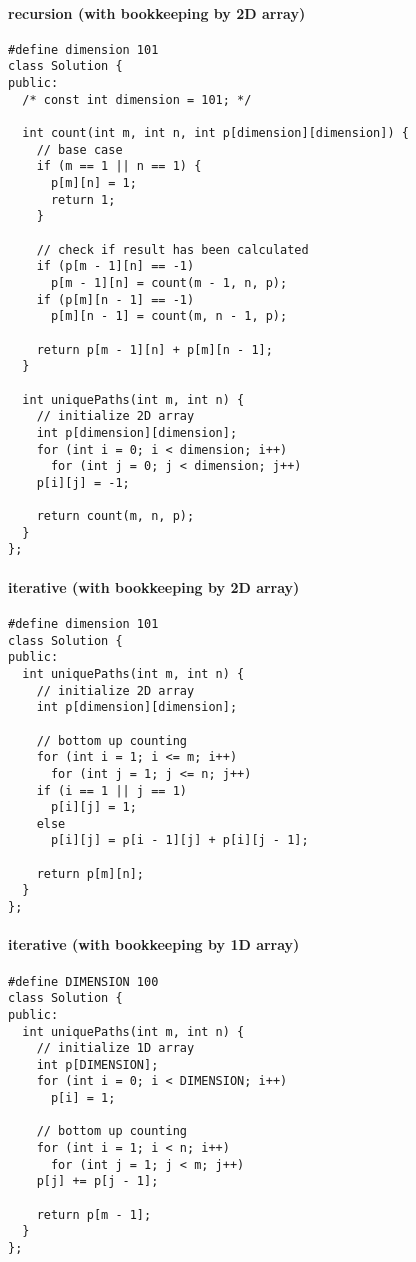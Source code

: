 \documentclass[11pt]{article}
\begin{document}
\paragraph{recursion (with bookkeeping by 2D array)}
\label{sec:org6ae9381}
\begin{verbatim}
#define dimension 101
class Solution {
public:
  /* const int dimension = 101; */

  int count(int m, int n, int p[dimension][dimension]) {
    // base case
    if (m == 1 || n == 1) {
      p[m][n] = 1;
      return 1;
    }

    // check if result has been calculated
    if (p[m - 1][n] == -1)
      p[m - 1][n] = count(m - 1, n, p);
    if (p[m][n - 1] == -1)
      p[m][n - 1] = count(m, n - 1, p);

    return p[m - 1][n] + p[m][n - 1];
  }

  int uniquePaths(int m, int n) {
    // initialize 2D array
    int p[dimension][dimension];
    for (int i = 0; i < dimension; i++)
      for (int j = 0; j < dimension; j++)
	p[i][j] = -1;

    return count(m, n, p);
  }
};
\end{verbatim}
\paragraph{iterative (with bookkeeping by 2D array)}
\label{sec:org82778be}
\begin{verbatim}
#define dimension 101
class Solution {
public: 
  int uniquePaths(int m, int n) {
    // initialize 2D array
    int p[dimension][dimension];

    // bottom up counting
    for (int i = 1; i <= m; i++)
      for (int j = 1; j <= n; j++)
	if (i == 1 || j == 1)
	  p[i][j] = 1;
	else
	  p[i][j] = p[i - 1][j] + p[i][j - 1];

    return p[m][n];
  }
};
\end{verbatim}
\paragraph{iterative (with bookkeeping by 1D array)}
\label{sec:org93ef14f}
\begin{verbatim}
#define DIMENSION 100
class Solution {
public: 
  int uniquePaths(int m, int n) {
    // initialize 1D array
    int p[DIMENSION];
    for (int i = 0; i < DIMENSION; i++)
      p[i] = 1;

    // bottom up counting
    for (int i = 1; i < n; i++)
      for (int j = 1; j < m; j++)
	p[j] += p[j - 1];

    return p[m - 1];
  }
};
\end{verbatim}
\end{document}
